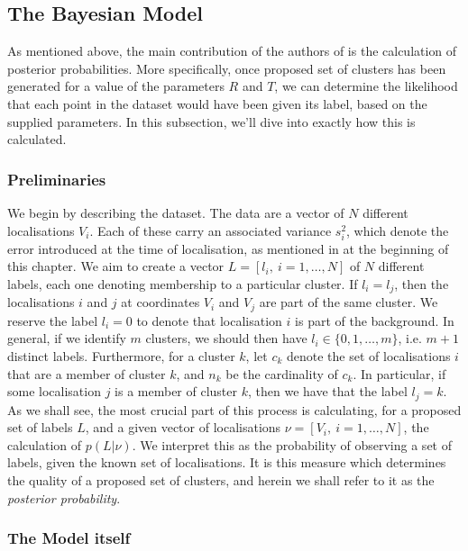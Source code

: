 \documentclass[11pt]{article}
\begin{document}
\subsection{The Bayesian Model}
\label{thebayesianmodel}

As mentioned above, the main contribution of the authors of \cite{Rubin-Delanchy2015} is the calculation of posterior probabilities. More specifically, once  proposed set of clusters has been generated for a value of the parameters $R$ and $T$, we can determine the likelihood that each point in the dataset would have been given its label, based on the supplied parameters. In this subsection, we'll dive into exactly how this is calculated. 

\subsubsection{Preliminaries}
We begin by describing the dataset. The data are a vector of $N$ different localisations $V_i$. Each of these carry an associated variance $s_i^2$, which denote the error introduced at the time of localisation, as mentioned in at the beginning of this chapter. 
We aim to create a vector $L = [l_i, \ i = 1, \dots , N]$ of $N$ different labels, each one denoting membership to a particular cluster. If $l_i = l_j$, then the localisations $i$ and $j$ at coordinates $V_i$ and $V_j$ are part of the same cluster. We reserve the label $l_i = 0$ to denote that localisation $i$ is part of the background. In general, if we identify $m$ clusters, we should then have $l_i \in \{0, 1, \dots, m\}$, i.e. $m+1$ distinct labels. Furthermore, for a cluster $k$, let $c_k$ denote the set of localisations $i$ that are a member of cluster $k$, and $n_k$ be the cardinality of $c_k$. In particular, if some localisation $j$ is a member of cluster $k$, then we have that the label $l_j = k $. As we shall see, the most crucial part of this process is calculating, for a proposed set of labels $L$, and a given vector of localisations $\nu = [V_i, \ i = 1, \dots, N]$, the calculation of $p(L|\nu)$. We interpret this as the probability of observing a set of labels, given the known set of localisations. It is this measure which determines the quality of a proposed set of clusters, and herein we shall refer to it as the \textit{posterior probability}.  \\

\subsubsection{The Model itself}
\label{themodelitself}
\end{document}
